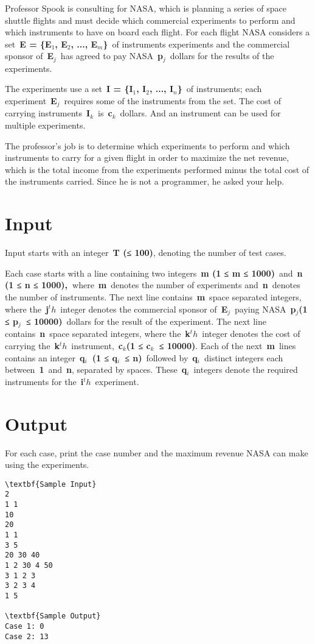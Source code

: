 

Professor Spook is consulting for NASA, which is planning a series of space shuttle flights and must decide which commercial experiments to perform and which instruments to have on board each flight. For each flight NASA considers a set \textbf{E = \{E$_1$, E$_2$, ..., E$_m$\}} of instruments experiments and the commercial sponsor of \textbf{E$_j$} has agreed to pay NASA \textbf{p$_j$} dollars for the results of the experiments.

The experiments use a set \textbf{I = \{I$_1$, I$_2$, ..., I$_n$\}} of instruments; each experiment \textbf{E$_j$} requires some of the instruments from the set. The cost of carrying instruments \textbf{I$_k$} is \textbf{c$_k$} dollars. And an instrument can be used for multiple experiments.

The professor's job is to determine which experiments to perform and which instruments to carry for a given flight in order to maximize the net revenue, which is the total income from the experiments performed minus the total cost of the instruments carried. Since he is not a programmer, he asked your help.

\section{Input}

Input starts with an integer \textbf{T (}\textbf{≤ 100)}, denoting the number of test cases.

Each case starts with a line containing two integers \textbf{m (1 ≤ m ≤ 1000)} and \textbf{n (1 ≤ n ≤ 1000), }where \textbf{m} denotes the number of experiments and \textbf{n} denotes the number of instruments. The next line contains \textbf{m} space separated integers, where the \textbf{j$^th$} integer denotes the commercial sponsor of \textbf{E$_j$} paying NASA \textbf{p$_j $(1 ≤ p$_j$ ≤ 10000)} dollars for the result of the experiment. The next line contains \textbf{n} space separated integers, where the \textbf{k$^th$} integer denotes the cost of carrying the \textbf{k$^th$} instrument, \textbf{c$_k $(1 ≤ c$_k$ ≤ 10000)}. Each of the next \textbf{m} lines contains an integer \textbf{q$_i$ (1 ≤ q$_i$ ≤ n)} followed by \textbf{q$_i$} distinct integers each between \textbf{1} and \textbf{n}, separated by spaces. These \textbf{q$_i$} integers denote the required instruments for the \textbf{i$^th$} experiment.

\section{Output}

For each case, print the case number and the maximum revenue NASA can make using the experiments.
\begin{verbatim}
\textbf{Sample Input}
2
1 1
10
20
1 1
3 5
20 30 40
1 2 30 4 50
3 1 2 3
3 2 3 4
1 5

\textbf{Sample Output}
Case 1: 0
Case 2: 13\end{verbatim}